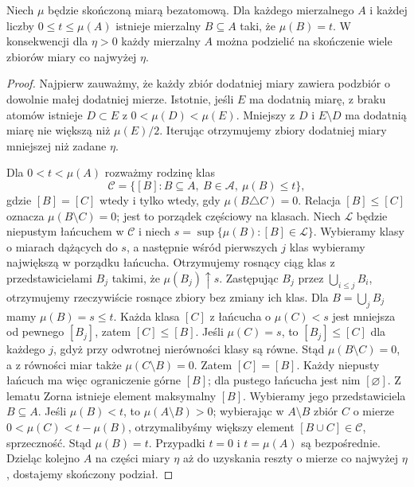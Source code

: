 \begin{lemat}
\label{lem:nonatomic-divisibility-30}
Niech $\mu$ będzie skończoną miarą bezatomową.
Dla każdego mierzalnego $A$ i każdej liczby
$0\le t\le\mu(A)$ istnieje mierzalny $B\subseteq A$
taki, że $\mu(B)=t$. W konsekwencji dla $\eta>0$
każdy mierzalny $A$ można podzielić na skończenie
wiele zbiorów miary co najwyżej $\eta$.
\end{lemat}
\begin{proof}
Najpierw zauważmy, że każdy zbiór dodatniej miary
zawiera podzbiór o dowolnie małej dodatniej mierze.
Istotnie, jeśli $E$ ma dodatnią miarę, z braku atomów
istnieje $D\subset E$ z $0<\mu(D)<\mu(E)$.
Mniejszy z $D$ i $E\setminus D$ ma dodatnią miarę
nie większą niż $\mu(E)/2$. Iterując otrzymujemy
zbiory dodatniej miary mniejszej niż zadane $\eta$.

Dla $0<t<\mu(A)$ rozważmy rodzinę klas
\[
 \mathcal C=\{[B]: B\subseteq A,\ B\in\mathcal A,\ \mu(B)\le t\},
\]
gdzie $[B]=[C]$ wtedy i tylko wtedy, gdy
$\mu(B\triangle C)=0$. Relacja $[B]\le[C]$
oznacza $\mu(B\setminus C)=0$; jest to porządek
częściowy na klasach. Niech $\mathcal L$ będzie
niepustym łańcuchem w $\mathcal C$ i niech
$s=\sup\{\mu(B):[B]\in\mathcal L\}$.
Wybieramy klasy o miarach dążących do $s$,
a następnie wśród pierwszych $j$ klas wybieramy
największą w porządku łańcucha. Otrzymujemy
rosnący ciąg klas z przedstawicielami $B_j$
takimi, że $\mu(B_j)\uparrow s$.
Zastępując $B_j$ przez $\bigcup_{i\le j}B_i$,
otrzymujemy rzeczywiście rosnące zbiory bez zmiany
ich klas. Dla $B=\bigcup_jB_j$ mamy $\mu(B)=s\le t$.
Każda klasa $[C]$ z łańcucha o $\mu(C)<s$
jest mniejsza od pewnego $[B_j]$, zatem $[C]\le[B]$.
Jeśli $\mu(C)=s$, to $[B_j]\le[C]$ dla każdego $j$,
gdyż przy odwrotnej nierówności klasy są równe.
Stąd $\mu(B\setminus C)=0$, a z równości miar
także $\mu(C\setminus B)=0$. Zatem $[C]=[B]$.
Każdy niepusty łańcuch ma więc ograniczenie górne
$[B]$; dla pustego łańcucha jest nim $[\varnothing]$.
Z lematu Zorna istnieje element maksymalny $[B]$.
Wybieramy jego przedstawiciela $B\subseteq A$.
Jeśli $\mu(B)<t$, to $\mu(A\setminus B)>0$;
wybierając w $A\setminus B$ zbiór $C$ o mierze
$0<\mu(C)<t-\mu(B)$, otrzymalibyśmy większy
element $[B\cup C]\in\mathcal C$, sprzeczność.
Stąd $\mu(B)=t$. Przypadki $t=0$ i $t=\mu(A)$
są bezpośrednie. Dzieląc kolejno $A$ na części
miary $\eta$ aż do uzyskania reszty o mierze
co najwyżej $\eta$, dostajemy skończony podział.
\end{proof}


